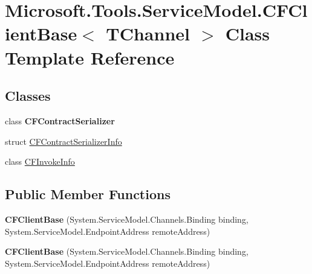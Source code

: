 \hypertarget{class_microsoft_1_1_tools_1_1_service_model_1_1_c_f_client_base_3_01_t_channel_01_4}{
\section{Microsoft.Tools.ServiceModel.CFClientBase$<$ TChannel $>$ Class Template Reference}
\label{class_microsoft_1_1_tools_1_1_service_model_1_1_c_f_client_base_3_01_t_channel_01_4}
}
\subsection*{Classes}
\begin{DoxyCompactItemize}
\item 
class {\bfseries CFContractSerializer}
\item 
struct \hyperlink{struct_microsoft_1_1_tools_1_1_service_model_1_1_c_f_client_base_3_01_t_channel_01_4_1_1_c_f_contract_serializer_info}{CFContractSerializerInfo}
\item 
class \hyperlink{class_microsoft_1_1_tools_1_1_service_model_1_1_c_f_client_base_3_01_t_channel_01_4_1_1_c_f_invoke_info}{CFInvokeInfo}
\end{DoxyCompactItemize}
\subsection*{Public Member Functions}
\begin{DoxyCompactItemize}
\item 
\hypertarget{class_microsoft_1_1_tools_1_1_service_model_1_1_c_f_client_base_3_01_t_channel_01_4_a1f6b4ded6e8575102944e7223c0f1954}{
{\bfseries CFClientBase} (System.ServiceModel.Channels.Binding binding, System.ServiceModel.EndpointAddress remoteAddress)}
\label{class_microsoft_1_1_tools_1_1_service_model_1_1_c_f_client_base_3_01_t_channel_01_4_a1f6b4ded6e8575102944e7223c0f1954}

\item 
\hypertarget{class_microsoft_1_1_tools_1_1_service_model_1_1_c_f_client_base_3_01_t_channel_01_4_a1f6b4ded6e8575102944e7223c0f1954}{
{\bfseries CFClientBase} (System.ServiceModel.Channels.Binding binding, System.ServiceModel.EndpointAddress remoteAddress)}
\label{class_microsoft_1_1_tools_1_1_service_model_1_1_c_f_client_base_3_01_t_channel_01_4_a1f6b4ded6e8575102944e7223c0f1954}

\end{DoxyCompactItemize}
